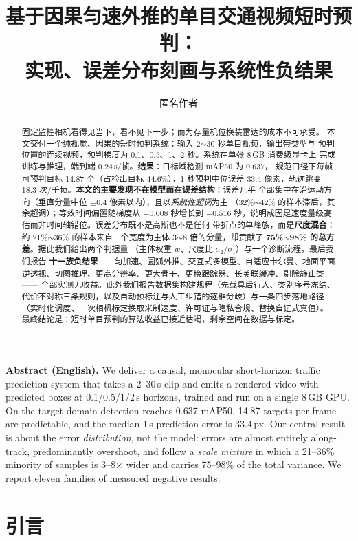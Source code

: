 \documentclass[11pt,a4paper]{ctexart}
\title{基于因果匀速外推的单目交通视频短时预判：\\实现、误差分布刻画与系统性负结果}
\author{匿名作者}
\date{}
\begin{document}
\maketitle

\begin{abstract}
固定监控相机看得见当下，看不见下一步；而为存量机位换装雷达的成本不可承受。
本文交付一个纯视觉、因果的短时预判系统：输入 2$\sim$30 秒单目视频，输出带类型与
预判位置的连续视频，预判梯度为 0.1、0.5、1、2 秒。系统在单张 8\,GB 消费级显卡上
完成训练与推理，端到端 0.24\,s/帧。\textbf{结果}：目标域检测 mAP50 为 0.637，
规范口径下每帧可预判目标 14.87 个（占检出目标 44.6\%），1 秒预判中位误差 33.4
像素，轨迹跳变 18.3 次/千帧。\textbf{本文的主要发现不在模型而在误差结构}：误差几乎
全部集中在沿运动方向（垂直分量中位 $\pm0.4$ 像素以内），且以\emph{系统性超调}为主
（32\%$\sim$42\% 的样本滞后，其余超调）；等效时间偏置随梯度从 $-0.008$ 秒增长到
$-0.516$ 秒，说明成因是速度量级高估而非时间轴错位。误差分布既不是高斯也不是任何
带折点的单峰族，而是\textbf{尺度混合}：约 21\%$\sim$36\% 的样本来自一个宽度为主体
3$\sim$8 倍的分量，却贡献了 \textbf{75\%$\sim$98\% 的总方差}。据此我们给出两个判据量
（主体权重 $w$、尺度比 $\sigma_2/\sigma_1$）与一个诊断流程。最后我们报告
\textbf{十一族负结果}——匀加速、圆弧外推、交互式多模型、自适应卡尔曼、地面平面
逆透视、切图推理、更高分辨率、更大骨干、更换跟踪器、长关联缓冲、剔除静止类——
全部实测无收益。此外我们报告数据集构建规程（先载具后行人、类别序号冻结、
代价不对称三条规则，以及自动预标注与人工纠错的逐框分歧）与一条四步落地路径
（实时化调度、一次相机标定换取米制速度、许可证与隐私合规、替换自证式真值）。
最终结论是：短时单目预判的算法收益已接近枯竭，剩余空间在数据与标定。
\end{abstract}

\vspace{4pt}
\noindent\textbf{Abstract (English).} We deliver a causal, monocular short-horizon
traffic prediction system that takes a 2--30\,s clip and emits a rendered video with
predicted boxes at 0.1/0.5/1/2\,s horizons, trained and run on a single 8\,GB GPU.
On the target domain detection reaches 0.637 mAP50, 14.87 targets per frame are
predictable, and the median 1\,s prediction error is 33.4\,px. Our central result is
about the error \emph{distribution}, not the model: errors are almost entirely
along-track, predominantly overshoot, and follow a \emph{scale mixture} in which a
21--36\% minority of samples is 3--8$\times$ wider and carries 75--98\% of the total
variance. We report eleven families of measured negative results.

\section{引言}
\label{sec:intro}
\end{document}

